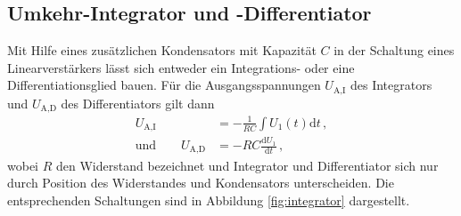 \subsection{Umkehr-Integrator und -Differentiator}
\label{subsec:integrator}
Mit Hilfe eines zusätzlichen Kondensators mit Kapazität $C$ in der Schaltung
eines Linearverstärkers lässt sich entweder ein Integrations- oder eine
Differentiationsglied bauen.
Für die Ausgangsspannungen $U_\text{A,I}$ des Integrators und $U_\text{A,D}$
des Differentiators gilt dann
\begin{align*}
    U_\text{A,I} &= - \frac{1}{RC} \int U_1\!(t) \mathup{d}t\,,\\
    \text{und} \qquad U_\text{A,D} &= - RC \frac{\mathup{d}U_1}{\mathup{d}t}\,,
\end{align*}
wobei $R$ den Widerstand bezeichnet und Integrator und Differentiator sich
nur durch Position des Widerstandes und Kondensators unterscheiden.
Die entsprechenden Schaltungen sind in Abbildung \ref{fig:integrator}
dargestellt.
